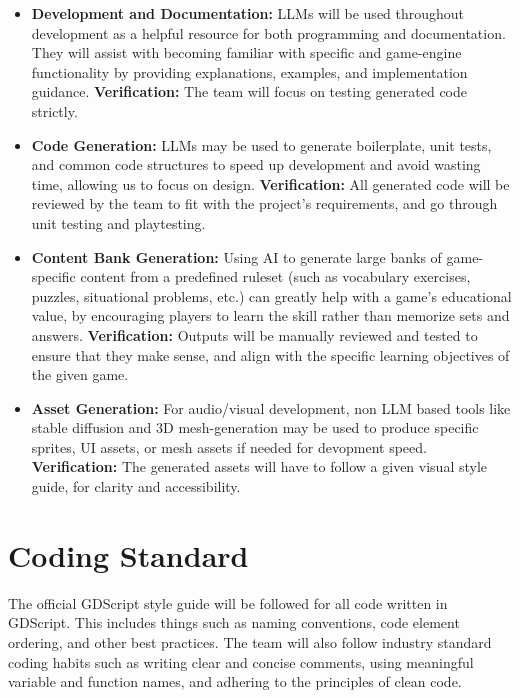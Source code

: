 \documentclass{article}
\begin{document}
\begin{itemize}

\item \textbf{Development and Documentation:} LLMs will be used throughout development as a helpful resource for both programming and documentation. They will assist with becoming familiar with specific and game-engine functionality by providing explanations, examples, and implementation guidance.
\newline \textbf{Verification:} The team will focus on testing generated code strictly.
\item \textbf{Code Generation:} LLMs may be used to generate boilerplate, unit tests, and common code structures to speed up development and avoid wasting time, allowing us to focus on design.
\newline \textbf{Verification:} All generated code will be reviewed by the team to fit with the project's requirements, and go through unit testing and playtesting.
\item \textbf{Content Bank Generation:} Using AI to generate large banks of game-specific content from a predefined ruleset (such as vocabulary exercises, puzzles, situational problems, etc.) can greatly help with a game's educational value, by encouraging players to learn the skill rather than memorize sets and answers. 
\newline \textbf{Verification:} Outputs will be manually reviewed and tested to ensure that they make sense, and align with the specific learning objectives of the given game.
\item \textbf{Asset Generation:} For audio/visual development, non LLM based tools like stable diffusion and 3D mesh-generation may be used to produce specific sprites, UI assets, or mesh assets if needed for devopment speed. 
\newline \textbf{Verification:} The generated assets will have to follow a given visual style guide, for clarity and accessibility.

\end{itemize}

\section{Coding Standard}

The official GDScript style guide will be followed for all code written in GDScript. This includes things such as naming conventions, code element ordering, and other best practices. The team will also follow industry standard coding habits such as writing clear and concise comments, using meaningful variable and function names, and adhering to the principles of clean code.
\end{document}
